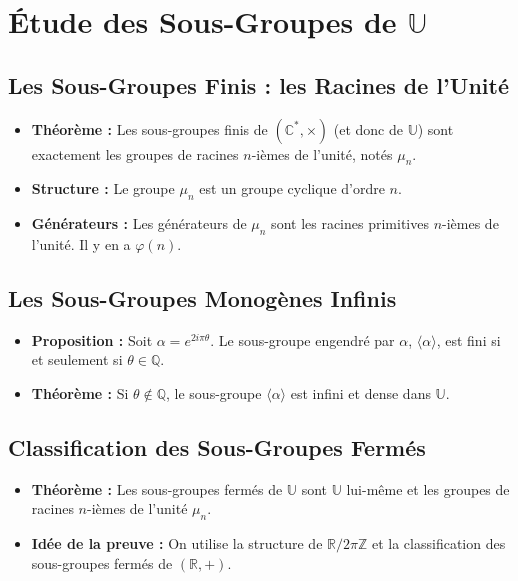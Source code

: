 \documentclass[12pt, a4paper, parskip=full]{report}
\theoremstyle{agregstyle}
\begin{document}
\section{Étude des Sous-Groupes de $\mathbb{U}$}

\subsection{Les Sous-Groupes Finis : les Racines de l'Unité}
\begin{itemize}
    \item \textbf{Théorème :} Les sous-groupes finis de $(\mathbb{C}^*, \times)$ (et donc de $\mathbb{U}$) sont exactement les groupes de racines $n$-ièmes de l'unité, notés $\mu_n$.
    \item \textbf{Structure :} Le groupe $\mu_n$ est un groupe cyclique d'ordre $n$.
    \item \textbf{Générateurs :} Les générateurs de $\mu_n$ sont les racines primitives $n$-ièmes de l'unité. Il y en a $\varphi(n)$.
\end{itemize}

\subsection{Les Sous-Groupes Monogènes Infinis}
\begin{itemize}
    \item \textbf{Proposition :} Soit $\alpha = e^{2i\pi\theta}$. Le sous-groupe engendré par $\alpha$, $\langle \alpha \rangle$, est fini si et seulement si $\theta \in \mathbb{Q}$.
    \item \textbf{Théorème :} Si $\theta \notin \mathbb{Q}$, le sous-groupe $\langle \alpha \rangle$ est infini et dense dans $\mathbb{U}$.
\end{itemize}

\subsection{Classification des Sous-Groupes Fermés}
\begin{itemize}
    \item \textbf{Théorème :} Les sous-groupes fermés de $\mathbb{U}$ sont $\mathbb{U}$ lui-même et les groupes de racines $n$-ièmes de l'unité $\mu_n$.
    \item \textbf{Idée de la preuve :} On utilise la structure de $\mathbb{R}/2\pi\mathbb{Z}$ et la classification des sous-groupes fermés de $(\mathbb{R},+)$.
\end{itemize}
\end{document}
